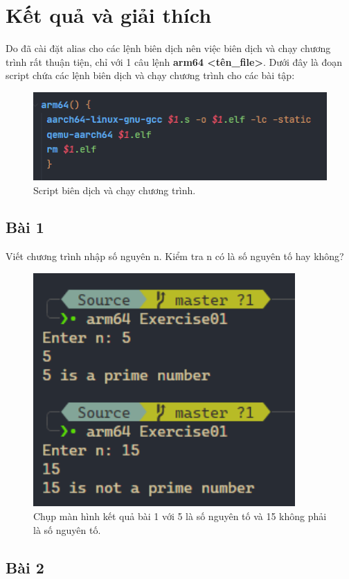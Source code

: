 \newpage
\section{Kết quả và giải thích}
Do đã cài đặt alias cho các lệnh biên dịch nên việc biên dịch và chạy chương trình rất thuận tiện, chỉ với 1 câu lệnh \textbf{arm64 <tên\_file>}. Dưới đây là đoạn script chứa các lệnh biên dịch và chạy chương trình cho các bài tập:
\begin{figure}[H]
	\centering
	\includegraphics[width=\textwidth]{images/img0.PNG}
	\caption{Script biên dịch và chạy chương trình.}
\end{figure}
\subsection{Bài 1}
Viết chương trình nhập số nguyên n. Kiểm tra n có là số nguyên tố hay không?


\begin{figure}[H]
	\centering
	\includegraphics[width=10cm]{images/img1.PNG}
	\caption{Chụp màn hình kết quả bài 1 với 5 là số nguyên tố và 15 không phải là số nguyên tố.}
\end{figure}

\subsection{Bài 2}


